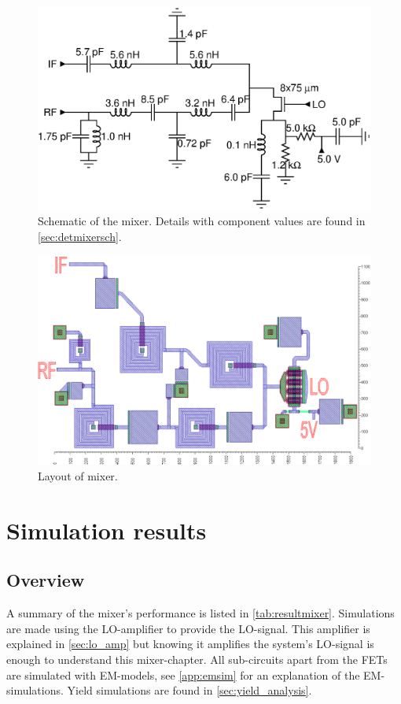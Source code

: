 		\begin{figure}[hbt!]
			\centering
			\includegraphics[width=1.0\textwidth]{fig/mixer/sch_mixer}
			\caption[Mixer schematic.]{Schematic of the mixer. Details with component values are found in \autoref{sec:detmixersch}.}\label{fig:mixerschematic}
		\end{figure}

		\begin{figure}[hbt!]
			\centering
			\includegraphics[width=1.0\textwidth]{fig/mixer/layout}
			\caption[Mixer layout.]{Layout of mixer.\scalemum}\label{fig:mixerlayout}
		\end{figure}

	\section{Simulation results}\label{sec:mixer}
		\subsection{Overview}
			A summary of the mixer's performance is listed in \autoref{tab:resultmixer}. Simulations are made using the LO-amplifier to provide the LO-signal. This amplifier is explained in \autoref{sec:lo_amp} but knowing it amplifies the system's LO-signal is enough to understand this mixer-chapter. All sub-circuits apart from the FETs are simulated with EM-models, see \autoref{app:emsim} for an explanation of the EM-simulations. Yield simulations are found in \autoref{sec:yield_analysis}.

